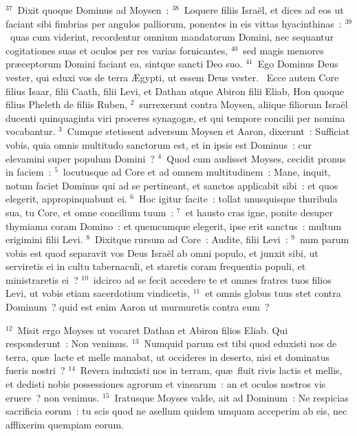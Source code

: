 ${}^{37}$~Dixit quoque Dominus ad Moysen~:
${}^{38}$~Loquere filiis Isra\"el, et dices ad eos ut faciant sibi fimbrias per angulos palliorum, ponentes in eis vittas hyacinthinas~:
${}^{39}$~quas cum viderint, recordentur omnium mandatorum Domini, nec sequantur cogitationes suas et oculos per res varias fornicantes,
${}^{40}$~sed magis memores pr\ae ceptorum Domini faciant ea, sintque sancti Deo suo.
${}^{41}$~Ego Dominus Deus vester, qui eduxi vos de terra \AE gypti, ut essem Deus vester.
~Ecce autem Core filius Isaar, filii Caath, filii Levi, et Dathan atque Abiron filii Eliab, Hon quoque filius Pheleth de filiis Ruben,
${}^{2}$~surrexerunt contra Moysen, aliique filiorum Isra\"el ducenti quinquaginta viri proceres synagog\ae , et qui tempore concilii per nomina vocabantur.
${}^{3}$~Cumque stetissent adversum Moysen et Aaron, dixerunt~: Sufficiat vobis, quia omnis multitudo sanctorum est, et in ipsis est Dominus~: cur elevamini super populum Domini~?
${}^{4}$~Quod cum audisset Moyses, cecidit pronus in faciem~:
${}^{5}$~locutusque ad Core et ad omnem multitudinem~: Mane, inquit, notum faciet Dominus qui ad se pertineant, et sanctos applicabit sibi~: et quos elegerit, appropinquabunt ei.
${}^{6}$~Hoc igitur facite~: tollat unusquisque thuribula sua, tu Core, et omne concilium tuum~:
${}^{7}$~et hausto cras igne, ponite desuper thymiama coram Domino~: et quemcumque elegerit, ipse erit sanctus~: multum erigimini filii Levi.
${}^{8}$~Dixitque rursum ad Core~: Audite, filii Levi~:
${}^{9}$~num parum vobis est quod separavit vos Deus Isra\"el ab omni populo, et junxit sibi, ut serviretis ei in cultu tabernaculi, et staretis coram frequentia populi, et ministraretis ei~?
${}^{10}$~idcirco ad se fecit accedere te et omnes fratres tuos filios Levi, ut vobis etiam sacerdotium vindicetis,
${}^{11}$~et omnis globus tuus stet contra Dominum~? quid est enim Aaron ut murmuretis contra eum~?


${}^{12}$~Misit ergo Moyses ut vocaret Dathan et Abiron filios Eliab. Qui responderunt~: Non venimus.
${}^{13}$~Numquid parum est tibi quod eduxisti nos de terra, qu\ae\ lacte et melle manabat, ut occideres in deserto, nisi et dominatus fueris nostri~?
${}^{14}$~Revera induxisti nos in terram, qu\ae\ fluit rivis lactis et mellis, et dedisti nobis possessiones agrorum et vinearum~: an et oculos nostros vis eruere~? non venimus.
${}^{15}$~Iratusque Moyses valde, ait ad Dominum~: Ne respicias sacrificia eorum~: tu scis quod ne asellum quidem umquam acceperim ab eis, nec afflixerim quempiam eorum.


